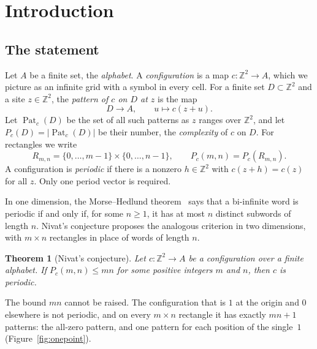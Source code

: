 \documentclass[11pt,a4paper,reqno]{amsart}
\newtheorem{theorem}{Theorem}[section]
\theoremstyle{definition}
\theoremstyle{remark}
\newcommand{\Z}{\mathbb Z}
\DeclareMathOperator{\Pat}{Pat}
\numberwithin{equation}{section}
\begin{document}
\section{Introduction}\label{sec:intro}

\subsection{The statement}
Let $A$ be a finite set, the \emph{alphabet}. A \emph{configuration} is a map $c\colon\Z^2\to A$, which we picture as an infinite grid with a symbol in every cell. For a finite set $D\subset\Z^2$ and a site $z\in\Z^2$, the \emph{pattern of $c$ on $D$ at $z$} is the map
\[
 D\to A,\qquad u\mapsto c(z+u).
\]
Let $\Pat_c(D)$ be the set of all such patterns as $z$ ranges over $\Z^2$, and let $P_c(D)=|\Pat_c(D)|$ be their number, the \emph{complexity} of $c$ on $D$. For rectangles we write
\[
 R_{m,n}=\{0,\ldots,m-1\}\times\{0,\ldots,n-1\},\qquad P_c(m,n)=P_c(R_{m,n}).
\]
A configuration is \emph{periodic} if there is a nonzero $h\in\Z^2$ with $c(z+h)=c(z)$ for all $z$. Only one period vector is required.

In one dimension, the Morse--Hedlund theorem~\cite{MH} says that a bi-infinite word is periodic if and only if, for some $n\ge1$, it has at most $n$ distinct subwords of length $n$. Nivat's conjecture proposes the analogous criterion in two dimensions, with $m\times n$ rectangles in place of words of length $n$.

\begin{theorem}[Nivat's conjecture]\label{thm:main}
Let $c\colon\Z^2\to A$ be a configuration over a finite alphabet. If $P_c(m,n)\le mn$ for some positive integers $m$ and $n$, then $c$ is periodic.
\end{theorem}

The bound $mn$ cannot be raised. The configuration that is $1$ at the origin and $0$ elsewhere is not periodic, and on every $m\times n$ rectangle it has exactly $mn+1$ patterns: the all-zero pattern, and one pattern for each position of the single~$1$ (Figure~\ref{fig:onepoint}).
\end{document}
